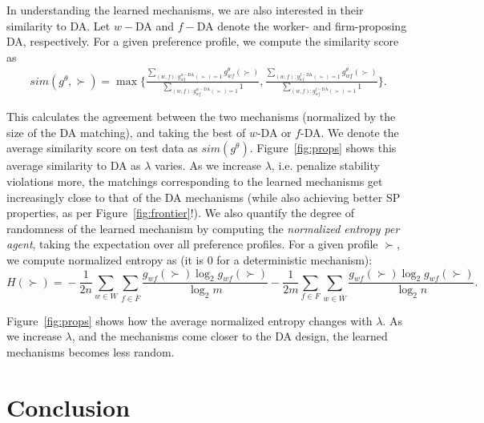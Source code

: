 \documentclass[11pt,letterpaper]{article}
\theoremstyle{definition}
\newcommand{\kibitz}[2]{\ifnum\Comments=1{\color{#1}{#2}}\fi}
\newcommand{\dcp}[1]{\kibitz{orange}{[DCP: #1]}}
\begin{document}
In understanding the learned mechanisms, we are also interested in their similarity to DA. 
Let $w-$DA and $f-$DA denote the worker- and firm-proposing DA, respectively. For a given preference profile, we compute the similarity score as
%
\begin{align}
\!\!\!\!\mathit{sim}(g^\theta, \succ) = \!\max\Bigg\{\!\frac{\sum_{(w, f): g^{w-\text{DA}}_{wf}(\succ) = 1} g^\theta_{wf}(\succ)}{\sum_{(w, f): g^{w-\text{DA}}_{wf}(\succ) = 1} 1}, \frac{\sum_{(w, f): g^{f-\text{DA}}_{wf}(\succ) = 1} g^\theta_{wf}(\succ)}{\sum_{(w, f): g^{f-\text{DA}}_{wf}(\succ) = 1} 1}\!\Bigg\}.
\end{align}

This calculates the agreement between the two mechanisms (normalized by the size of the DA matching), and taking the best of $w$-DA or $f$-DA. We denote the average similarity score on test data as $\mathit{sim}(g^\theta)$. %
%
%
Figure~\ref{fig:props} shows this average similarity to DA  as $\lambda$ varies. As we increase $\lambda$, i.e. penalize stability violations more, the matchings corresponding to the learned mechanisms get increasingly close to that of the DA mechanisms (while also achieving better SP properties, as per Figure~\ref{fig:frontier}!).
%
%
We also quantify the degree of randomness of the learned mechanism by computing the {\em  normalized entropy per agent}, taking the expectation over all preference profiles. For a  given profile $\succ$, we compute  normalized entropy as (it is 0 for a deterministic mechanism): 
\[
\!\!\!\!    H(\succ) \!= \!-\frac{1}{2n} \!\sum_{w \in W} \!\sum_{f \in \overline{F}} \!\frac{g_{wf}(\succ) \log_2 g_{wf}(\succ)}{\log_2 m} \!-\! \frac{1}{2m}\!\sum_{f \in F}\!\sum_{w \in \overline{W}}\! \frac{g_{wf}(\succ) \log_2 g_{wf}(\succ)}{\log_2 n}.
\]

Figure~\ref{fig:props} shows how the average normalized entropy changes with $\lambda$. As we increase $\lambda$, and the mechanisms come closer to the DA design, the learned mechanisms becomes less random.

\section{Conclusion}
\label{sec:limit}
\end{document}
